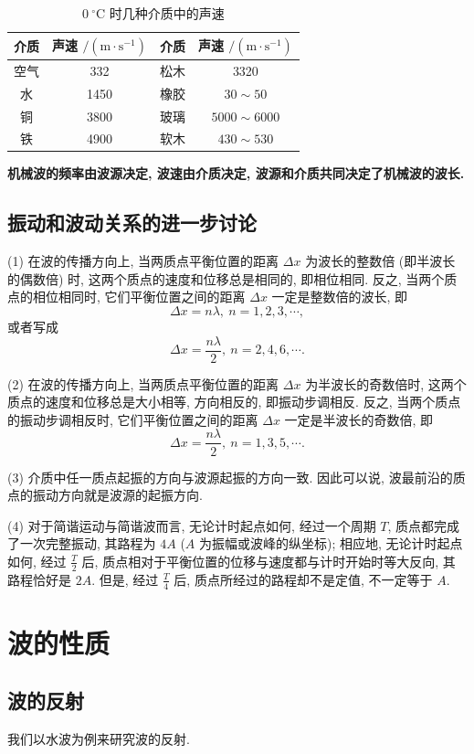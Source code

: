 \documentclass[UTF8,openany,fontset=fandol]{ctexbook}
\theoremstyle{chinesetextbook}
\newcommand{\unit}[1]{\ \mathrm{#1}}
\begin{document}
\begin{table}[htbp]
\centering
\caption{$0\unit{^\circ C}$ 时几种介质中的声速}
\label{tab:声速表}
\begin{tabular}{|c|c||c|c|}
\hline
\textbf{介质} & \textbf{声速 $\mathrm{/(m\cdot s^{-1})}$} & \textbf{介质} & \textbf{声速 $\mathrm{/(m\cdot s^{-1})}$} \\
\hline
空气 & 332 & 松木 & 3320 \\
\hline
水 & 1450 & 橡胶 & $30\sim 50$ \\
\hline
铜 & 3800 & 玻璃 & $5000\sim 6000$ \\
\hline
铁 & 4900 & 软木 & $430\sim 530$ \\
\hline
\end{tabular}
\end{table}

\textbf{机械波的频率由波源决定, 波速由介质决定, 波源和介质共同决定了机械波的波长.}
\subsection*{振动和波动关系的进一步讨论}
(1) 在波的传播方向上, 当两质点平衡位置的距离 $\Delta x$ 为波长的整数倍 (即半波长的偶数倍) 时, 这两个质点的速度和位移总是相同的, 即相位相同. 反之, 当两个质点的相位相同时, 它们平衡位置之间的距离 $\Delta x$ 一定是整数倍的波长, 即
\[
\Delta x=n\lambda,\ n=1,2,3,\cdots,
\]
或者写成
\[
\Delta x=\frac{n\lambda}{2},\ n=2,4,6,\cdots.
\]

(2) 在波的传播方向上, 当两质点平衡位置的距离 $\Delta x$ 为半波长的奇数倍时, 这两个质点的速度和位移总是大小相等, 方向相反的, 即振动步调相反. 反之, 当两个质点的振动步调相反时, 它们平衡位置之间的距离 $\Delta x$ 一定是半波长的奇数倍, 即
\[
\Delta x=\frac{n\lambda}{2},\ n=1,3,5,\cdots.
\]

(3) 介质中任一质点起振的方向与波源起振的方向一致. 因此可以说, 波最前沿的质点的振动方向就是波源的起振方向.

(4) 对于简谐运动与简谐波而言, 无论计时起点如何, 经过一个周期 $T$, 质点都完成了一次完整振动, 其路程为 $4A$ ($A$ 为振幅或波峰的纵坐标); 相应地, 无论计时起点如何, 经过 $\displaystyle\frac{T}{2}$ 后, 质点相对于平衡位置的位移与速度都与计时开始时等大反向, 其路程恰好是 $2A$. 但是, 经过 $\displaystyle\frac{T}{4}$ 后, 质点所经过的路程却不是定值, 不一定等于 $A$.
\section{波的性质}
\subsection{波的反射}
我们以水波为例来研究波的反射.
\end{document}
